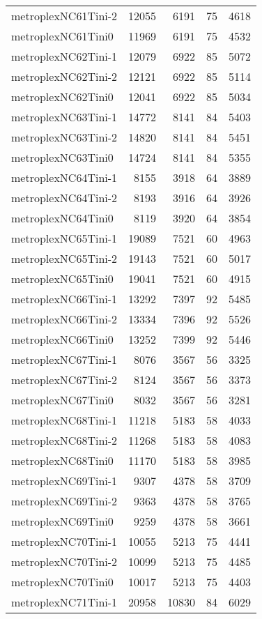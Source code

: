 \documentclass[../../../thesis.tex]{subfiles}
\begin{document}
\begin{longtable}{lrrrr}
metroplexNC61Tini-2 & 12055 & 6191 & 75 & 4618 \\
metroplexNC61Tini0 & 11969 & 6191 & 75 & 4532 \\
metroplexNC62Tini-1 & 12079 & 6922 & 85 & 5072 \\
metroplexNC62Tini-2 & 12121 & 6922 & 85 & 5114 \\
metroplexNC62Tini0 & 12041 & 6922 & 85 & 5034 \\
metroplexNC63Tini-1 & 14772 & 8141 & 84 & 5403 \\
metroplexNC63Tini-2 & 14820 & 8141 & 84 & 5451 \\
metroplexNC63Tini0 & 14724 & 8141 & 84 & 5355 \\
metroplexNC64Tini-1 & 8155 & 3918 & 64 & 3889 \\
metroplexNC64Tini-2 & 8193 & 3916 & 64 & 3926 \\
metroplexNC64Tini0 & 8119 & 3920 & 64 & 3854 \\
metroplexNC65Tini-1 & 19089 & 7521 & 60 & 4963 \\
metroplexNC65Tini-2 & 19143 & 7521 & 60 & 5017 \\
metroplexNC65Tini0 & 19041 & 7521 & 60 & 4915 \\
metroplexNC66Tini-1 & 13292 & 7397 & 92 & 5485 \\
metroplexNC66Tini-2 & 13334 & 7396 & 92 & 5526 \\
metroplexNC66Tini0 & 13252 & 7399 & 92 & 5446 \\
metroplexNC67Tini-1 & 8076 & 3567 & 56 & 3325 \\
metroplexNC67Tini-2 & 8124 & 3567 & 56 & 3373 \\
metroplexNC67Tini0 & 8032 & 3567 & 56 & 3281 \\
metroplexNC68Tini-1 & 11218 & 5183 & 58 & 4033 \\
metroplexNC68Tini-2 & 11268 & 5183 & 58 & 4083 \\
metroplexNC68Tini0 & 11170 & 5183 & 58 & 3985 \\
metroplexNC69Tini-1 & 9307 & 4378 & 58 & 3709 \\
metroplexNC69Tini-2 & 9363 & 4378 & 58 & 3765 \\
metroplexNC69Tini0 & 9259 & 4378 & 58 & 3661 \\
metroplexNC70Tini-1 & 10055 & 5213 & 75 & 4441 \\
metroplexNC70Tini-2 & 10099 & 5213 & 75 & 4485 \\
metroplexNC70Tini0 & 10017 & 5213 & 75 & 4403 \\
metroplexNC71Tini-1 & 20958 & 10830 & 84 & 6029 \\

\end{longtable}
\end{document}
